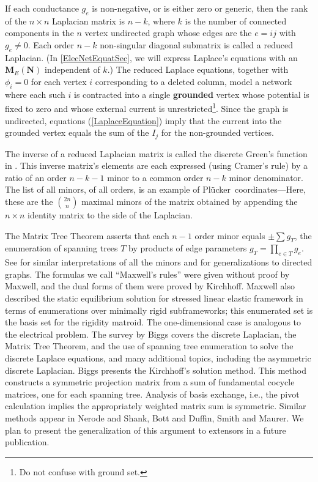 \documentclass[12pt]{article}
\theoremstyle{definition}
\newcommand{\ext}[1]{\ensuremath{\mathbf{#1}}}
\newcommand{\Plucker}{Pl\"{u}cker\ }
\begin{document}
If each  conductance $g_{e}$ is non-negative, 
or is either zero
or generic, then the rank of 
the $n\times n$ Laplacian matrix is $n-k$, 
where $k$ is the number of connected components in the $n$
vertex undirected graph whose edges
are the $e=ij$ with $g_{e}\neq 0$.  Each order $n-k$ non-singular
diagonal submatrix is called a reduced Laplacian.  
(In \textsection \ref{ElecNetEquatSec}, we will express Laplace's equations
with an $\ext{M}_E(\ext{N})$ independent of $k$.) 
The reduced Laplace 
equations, together with $\phi_i=0$ for each vertex $i$ corresponding
to a deleted column, model a network where each such $i$ is 
contracted into a single 
\textbf{grounded} vertex
whose potential is fixed to zero and whose 
external current is 
unrestricted\footnote{Do not confuse with ground set.}.  
Since the graph is undirected, equations (\ref{LaplaceEquation})
imply that the current into the grounded vertex equals
the sum of the $I_j$ for the non-grounded vertices.

The inverse of a reduced Laplacian matrix is called the
discrete Green's function in \cite{ChungYaoGreens}.
This inverse matrix's elements are each expressed (using Cramer's rule)
by a ratio of an order $n-k-1$ minor to a common order $n-k$ minor
denominator.
The %
list of all minors, of all orders,
is an example of \Plucker coordinates---Here, these are the 
$\binom{2n}{n}$ maximal minors of the matrix obtained by appending
the $n\times n$ identity matrix to the side of the Laplacian.

The Matrix Tree Theorem asserts that each $n-1$ order minor 
equals $\pm\sum g_T$, the enumeration of spanning trees $T$ by products
of edge parameters $g_T=\prod_{e \in T}g_e$.  
See \cite{sdcMTT} for 
similar interpretations of all the minors and 
for generalizations to directed graphs.
The formulas we call ``Maxwell's rules'' were given without
proof by Maxwell\cite{MaxR}, and the dual forms of them were proved
by Kirchhoff\cite{Kirchhoff}.
Maxwell also described the static equilibrium solution for 
stressed linear elastic
framework in terms of enumerations over minimally rigid 
subframeworks\cite{MaxwellsFramesPaper}; this enumerated set is the basis
set for the rigidity matroid\cite{RigidityBook}.  The one-dimensional case
is analogous to the electrical problem.
The survey by Biggs \cite{BiggsAlgPotTheory}
covers the discrete Laplacian, the Matrix Tree Theorem, and the
use of spanning tree enumeration to solve the discrete Laplace equations, and
many additional topics, including the asymmetric discrete Laplacian.
Biggs presents the Kirchhoff's solution method.
This method constructs a symmetric projection matrix from a sum of fundamental
cocycle matrices, one for each spanning tree.  Analysis of basis exchange,
i.e., the pivot calculation
implies the appropriately weighted matrix sum is symmetric.  
Similar methods appear in Nerode and Shank\cite{NerodeShank}, 
Bott and Duffin\cite{BottDuffinAlgNetworks}, Smith\cite{SmithElec}
and Maurer\cite{Maurer76}.
We plan to present
the generalization of this argument to extensors in a future publication.
\end{document}
